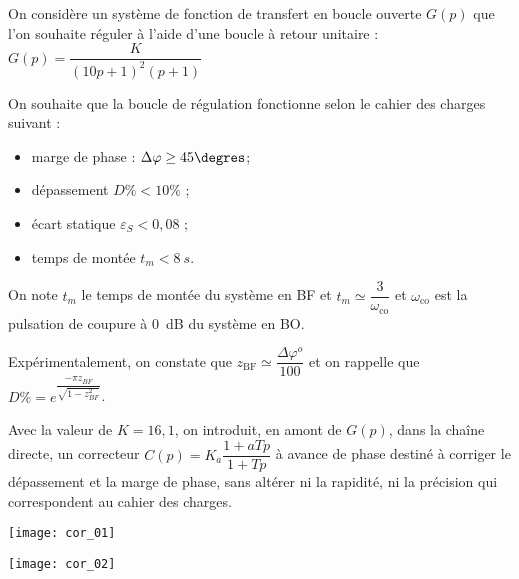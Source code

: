 \setcounter{exo}{0}
\begin{multicols}{2}



On considère un système de fonction de transfert en boucle ouverte $G(p)$ que l'on souhaite réguler à l’aide d'une boucle à retour unitaire : $G(p)=\dfrac{K}{\left(10p+1 \right)^2\left(p+1 \right)}$

On souhaite que la boucle de régulation fonctionne selon le cahier des charges suivant :
\begin{itemize}
\item marge de phase : $\Delta \varphi \geq 45\degres$;
\item dépassement $D\% < 10\%$ ; 
\item écart statique $\varepsilon_S < 0,08$ ; 
\item temps de montée $t_m < \SI{8}{s}$.
\end{itemize}


On note $t_m$ le temps de montée du système en BF et $t_m\simeq \dfrac{3}{\omega_{\text{co}}}$ et $\omega_{\text{co}}$ est la pulsation de coupure à \SI{0}{dB} du système en BO.  






Expérimentalement, on constate que 
$z_{\text{BF}}\simeq \dfrac{\Delta \varphi ^{o}}{100}$ 
et on rappelle que $D\% = e^{\dfrac{-\pi z_{BF}}{\sqrt{1-z_{BF}^2}}}$.




Avec la valeur de $K=16,1$, on introduit, en amont de $G(p)$, dans la chaîne directe, un correcteur $C(p)=K_a \dfrac{1+aTp}{1+Tp}$ à avance de phase destiné à corriger le dépassement et la marge de phase, sans altérer ni la rapidité, ni la précision qui correspondent au cahier des charges.



\end{multicols}
\ifprof
\newpage
\begin{center}

\texttt{[image: cor\_01]}

\texttt{[image: cor\_02]}
\end{center}
\else
\fi
